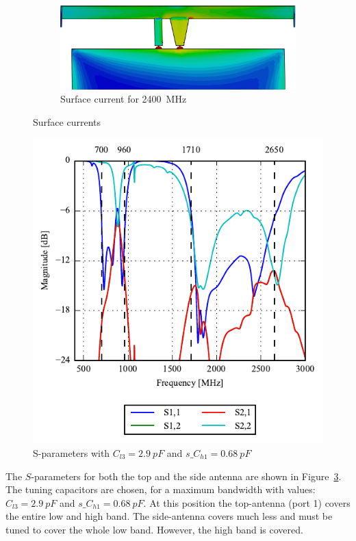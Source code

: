\begin{figure}[htbp]
\begin{subfigure}[b]{0.32\linewidth}
        \centering
        \includegraphics[width=\linewidth]{img/tech_sol/nonresonant/finka-surface-2400}
        \caption{Surface current for \SI{2400}{MHz}}
        \label{fig:ant3_sc2400}
    \end{subfigure}
    \caption{Surface currents}
    \label{fig:ant3_sc}
\end{figure}


\begin{figure}[htbp]
    \centering
    \includegraphics{img/tech_sol/nonresonant/simulation/freespace/Spara-static}
    \caption{S-parameters with $C_{l3} = \SI{2.9}{pF}$ and $s\_C_{h1} = \SI{0.68}{pF}$}
    \label{fig:ant3sparams}
\end{figure}

The $S$-parameters for both the top and the side antenna are shown in Figure~\ref{fig:ant3sparams}. The tuning capacitors are chosen, for a maximum bandwidth with values: $C_{l3} = \SI{2.9}{pF}$ and $s\_C_{h1} = \SI{0.68}{pF}$. At this position the top-antenna (port 1) covers the entire low and high band. The side-antenna covers much less and must be tuned to cover the whole low band. However, the high band is covered. 

